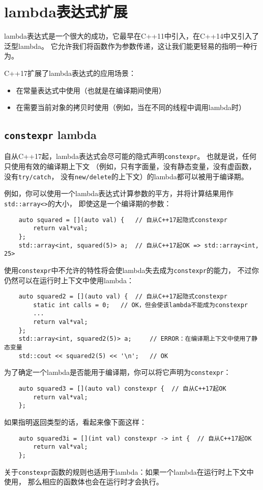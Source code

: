 \section{lambda表达式扩展}\label{ch6}
lambda表达式是一个很大的成功，它最早在C++11中引入，在C++14中又引入了泛型lambda。
它允许我们将函数作为参数传递，这让我们能更轻易的指明一种行为。

C++17扩展了lambda表达式的应用场景：
\begin{itemize}[leftmargin=*]
    \item 在常量表达式中使用（也就是在编译期间使用）
    \item 在需要当前对象的拷贝时使用（例如，当在不同的线程中调用lambda时）
\end{itemize}

\subsection{\texttt{constexpr} lambda}
自从C++17起，lambda表达式会尽可能的隐式声明\texttt{constexpr}。
也就是说，任何只使用有效的编译期上下文
（例如，只有字面量，没有静态变量，没有虚函数，没有\texttt{try/catch}，
没有\texttt{new/delete}的上下文）的lambda都可以被用于编译期。

例如，你可以使用一个lambda表达式计算参数的平方，并将计算结果用作\texttt{std::array<>}的大小，
即使这是一个编译期的参数：
\begin{lstlisting}
    auto squared = [](auto val) {   // 自从C++17起隐式constexpr
        return val*val;
    };
    std::array<int, squared(5)> a;  // 自从C++17起OK => std::array<int, 25>
\end{lstlisting}
使用\texttt{constexpr}中不允许的特性将会使lambda失去成为\texttt{constexpr}的能力，
不过你仍然可以在运行时上下文中使用lambda：
\begin{lstlisting}
    auto squared2 = [](auto val) {  // 自从C++17起隐式constexpr
        static int calls = 0;   // OK，但会使该lambda不能成为constexpr
        ...
        return val*val;
    };
    std::array<int, squared2(5)> a;     // ERROR：在编译期上下文中使用了静态变量
    std::cout << squared2(5) << '\n';   // OK
\end{lstlisting}
为了确定一个lambda是否能用于编译期，你可以将它声明为\texttt{constexpr}：
\begin{lstlisting}
    auto squared3 = [](auto val) constexpr {  // 自从C++17起OK
        return val*val;
    };
\end{lstlisting}
如果指明返回类型的话，看起来像下面这样：
\begin{lstlisting}
    auto squared3i = [](int val) constexpr -> int {  // 自从C++17起OK
        return val*val;
    };
\end{lstlisting}
关于\texttt{constexpr}函数的规则也适用于lambda：如果一个lambda在运行时上下文中使用，
那么相应的函数体也会在运行时才会执行。

